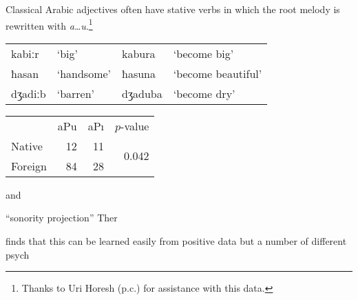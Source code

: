 Classical Arabic adjectives often have stative verbs in which the root melody is rewritten with \emph{a\ldots{}u}.\footnote{Thanks to Uri Horesh (p.c.) for assistance with this data.}

\begin{example}
\begin{tabular}{l l l l}
kabiːr  & `big'        & kabura  & `become big'       \\
ħasan   & `handsome'   & ħasuna  & `become beautiful' \\
dʒadiːb & `barren'     & dʒaduba & `become dry'       \\
\end{tabular}
\end{example}

 
\citet{Inkelas2001}

\begin{example}
\begin{tabular}{l r r r}
        & aPu & aPı & $p$-value \\
Native  & 12  & 11  & \multirow{2}{*}{0.042} \\
Foreign & 84  & 28  \\
\end{tabular}
\end{example}

\citet{NiChiosain1993} and \citet{Ito1995b} 

``sonority projection''
Ther

\citet{Daland2011b} finds that this can be learned easily from positive data but a number of different psych


